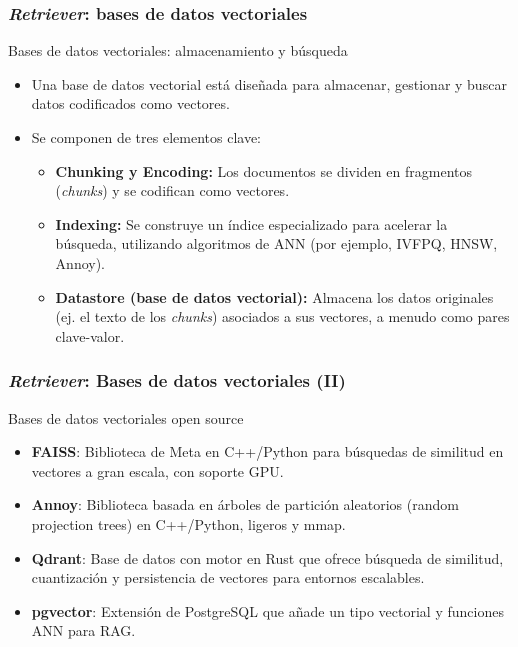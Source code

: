\documentclass[handout]{beamer}
\begin{document}
\begin{frame}
  \frametitle{\textit{Retriever}: bases de datos vectoriales}
  \begin{block}{Bases de datos vectoriales: almacenamiento y búsqueda}
      \begin{itemize}
        \item Una base de datos vectorial está diseñada para almacenar, gestionar y buscar datos codificados como vectores.
        \item Se componen de tres elementos clave:
            \begin{itemize}
                \item \textbf{Chunking y Encoding:} Los documentos se dividen en fragmentos (\textit{chunks}) y se codifican como vectores.
                \item \textbf{Indexing:} Se construye un índice especializado para acelerar la búsqueda, utilizando algoritmos de ANN (por ejemplo, IVFPQ, HNSW, Annoy).
                \item \textbf{Datastore (base de datos vectorial):} Almacena los datos originales (ej. el texto de los \textit{chunks}) asociados a sus vectores, a menudo como pares clave-valor.
            \end{itemize}
      \end{itemize}
  \end{block}
\end{frame}

\begin{frame}
  \frametitle{\textit{Retriever}: Bases de datos vectoriales (II)}
  \begin{block}{Bases de datos vectoriales open source}
    \begin{itemize}
      \item \textbf{FAISS}:  
      Biblioteca de Meta en C++/Python para búsquedas de similitud en vectores a gran escala, con soporte GPU.

      \item \textbf{Annoy}:  
      Biblioteca basada en árboles de partición aleatorios (random projection trees) en C++/Python, ligeros y mmap.

      \item \textbf{Qdrant}:  
      Base de datos con motor en Rust que ofrece búsqueda de similitud, cuantización y persistencia de vectores para entornos escalables.

      \item \textbf{pgvector}:  
      Extensión de PostgreSQL que añade un tipo vectorial y funciones ANN para RAG.
    \end{itemize}
  \end{block}
\end{frame}
\end{document}
